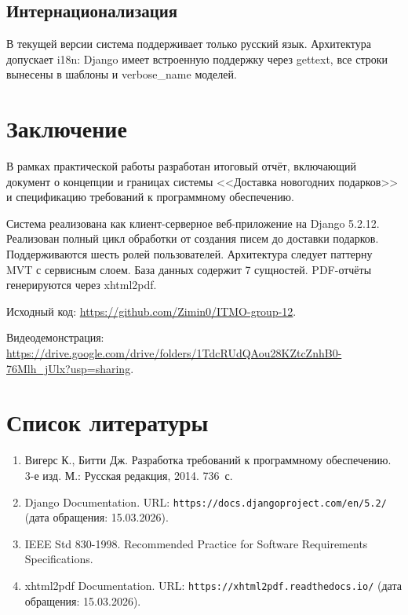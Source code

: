 \documentclass[14pt,a4paper]{extarticle}
\begin{document}
\subsection{Интернационализация}

В текущей версии система поддерживает только русский язык. Архитектура допускает i18n: Django имеет встроенную поддержку через gettext, все строки вынесены в шаблоны и verbose\_name моделей.

\newpage

\section*{Заключение}

В рамках практической работы разработан итоговый отчёт, включающий документ о концепции и границах системы <<Доставка новогодних подарков>> и спецификацию требований к программному обеспечению.

Система реализована как клиент-серверное веб-приложение на Django 5.2.12. Реализован полный цикл обработки от создания писем до доставки подарков. Поддерживаются шесть ролей пользователей. Архитектура следует паттерну MVT с сервисным слоем. База данных содержит 7 сущностей. PDF-отчёты генерируются через xhtml2pdf.

Исходный код: \url{https://github.com/Zimin0/ITMO-group-12}.

Видеодемонстрация: \url{https://drive.google.com/drive/folders/1TdcRUdQAou28KZtcZnhB0-76Mlh_jUlx?usp=sharing}.

\newpage

\section*{Список литературы}

\begin{enumerate}
    \item Вигерс К., Битти Дж. Разработка требований к программному обеспечению. 3-е изд. М.: Русская редакция, 2014. 736~с.
    \item Django Documentation. URL: \nolinkurl{https://docs.djangoproject.com/en/5.2/} (дата обращения: 15.03.2026).
    \item IEEE Std 830-1998. Recommended Practice for Software Requirements Specifications.
    \item xhtml2pdf Documentation. URL: \nolinkurl{https://xhtml2pdf.readthedocs.io/} (дата обращения: 15.03.2026).
\end{enumerate}
\end{document}
